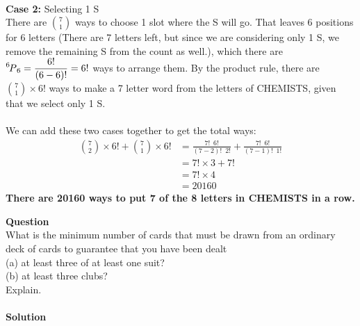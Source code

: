 \documentclass[article,12pt]{article}
\newcounter{question}
\def\questionnum{{\Large\bfseries{Question \arabic{question} }}\\[1em]}
\newcommand{\question}{
    \stepcounter{question}
    \questionnum
}
\newcommand{\solution}{
    {{\large\bfseries{Solution}}}
}
\newcommand{\df}{\displaystyle\frac} %
\newcommand\perm[2][^n]{\prescript{#1\mkern-2.5mu}{}P_{#2}}
\begin{document}
\\
\textbf{Case 2:} Selecting 1 S \\
There are $\displaystyle\binom{7}{1}$ ways to choose 1 slot where the S will go. That leaves 6 positions for 6 letters (There are 7 letters left, but since we are considering only 1 S, we remove the remaining S from the count as well.), which there are $\perm[6]{6} = \df{6!}{(6-6)!} = 6!$ ways to arrange them. By the product rule, there are $\displaystyle\binom{7}{1} \times 6!$ ways to make a 7 letter word from the letters of CHEMISTS, given that we select only 1 S. \\
\\
We can add these two cases together to get the total ways: 
\begin{align*}
    \binom{7}{2} \times 6! + \binom{7}{1} \times 6! &= \frac{7!\enspace 6!}{(7-2)! \enspace 2!} + \frac{7! \enspace 6!}{(7-1)! \enspace 1!} \\
                                                    &= 7! \times 3 + 7! \\
                                                    &= 7! \times 4 \\
                                                    &= 20160
\end{align*}
\textbf{There are 20160 ways to put 7 of the 8 letters in CHEMISTS in a row.}
\newpage
\question 
What is the minimum number of cards that must be drawn from an ordinary deck of cards to guarantee that you have been dealt \\ (a) at least three of at least one suit?\\ (b) at least three clubs?  \\ Explain. \\
\\
\solution
\end{document}

